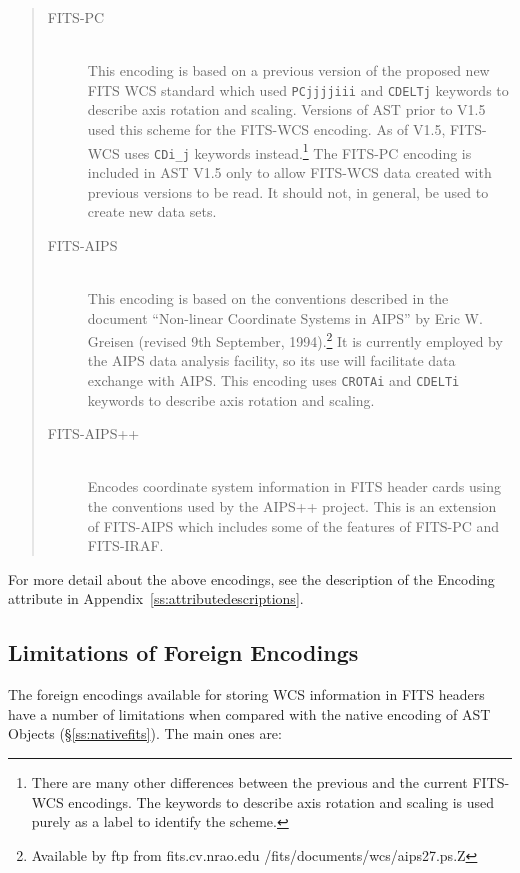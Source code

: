 \documentclass[twoside,11pt]{starlink}
\providecommand{\appref}[1]{Appendix~\ref{#1}}
\providecommand{\secref}[1]{\S\ref{#1}}
\begin{document}
\begin{quote}
\begin{description}
\item[FITS-PC]\mbox{}\\
This encoding is based on a previous version of the proposed new FITS WCS
standard which used \texttt{PCjjjjiii} and \texttt{CDELTj} keywords to describe
axis rotation and scaling. Versions of AST prior to V1.5 used this scheme
for the FITS-WCS encoding. As of V1.5, FITS-WCS uses \texttt{CDi\_j}
keywords instead.\footnote{There are many other differences between the
previous and the current FITS-WCS encodings. The keywords to describe
axis rotation and scaling is used purely as a label to identify the
scheme.} The FITS-PC encoding is included in AST V1.5 only to allow
FITS-WCS data created with previous versions to be read. It should not,
in general, be used to create new data sets.

\item[FITS-AIPS]\mbox{}\\
This encoding is based on the conventions described in the document
``Non-linear Coordinate Systems in AIPS'' by Eric W. Greisen (revised 9th
September, 1994).\footnote{Available by ftp from fits.cv.nrao.edu
/fits/documents/wcs/aips27.ps.Z} It is currently employed by the AIPS
data analysis facility, so its use will facilitate data exchange with
AIPS. This encoding uses \texttt{CROTAi} and \texttt{CDELTi} keywords to
describe axis rotation and scaling.

\item[FITS-AIPS++]\mbox{}\\
Encodes coordinate system information in FITS
header cards using the conventions used by the AIPS++ project.
This is an extension of FITS-AIPS which includes some of the
features of FITS-PC and FITS-IRAF.
\end{description}
\end{quote}

For more detail about the above encodings, see the description of the
Encoding attribute in \appref{ss:attributedescriptions}.

\subsection{\label{ss:foreignfitslimitations}Limitations of Foreign Encodings}

The foreign encodings available for storing WCS information in FITS
headers have a number of limitations when compared with the native
encoding of AST Objects (\secref{ss:nativefits}). The main ones are:
\end{document}
